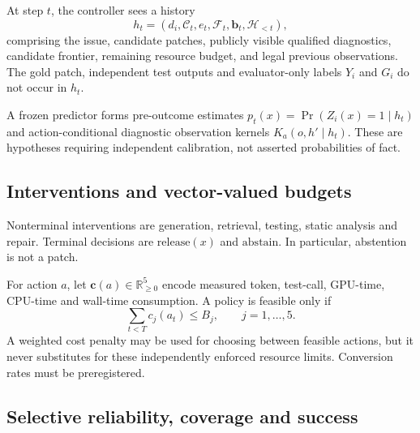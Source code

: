 \documentclass[pdflatex,sn-basic]{sn-jnl}
\begin{document}
At step $t$, the controller sees a history
\begin{equation}
 h_t=(d_i,\mathcal{C}_t,e_t,\mathcal{F}_t,\mathbf b_t,
       \mathcal H_{<t}),
 \label{eq:state}
\end{equation}
comprising the issue, candidate patches, publicly visible qualified
diagnostics, candidate frontier, remaining resource budget, and legal
previous observations. The gold patch, independent test outputs and
evaluator-only labels $Y_i$ and $G_i$ do not occur in $h_t$.

A frozen predictor forms pre-outcome estimates
$p_t(x)=\Pr(Z_i(x)=1\mid h_t)$ and action-conditional diagnostic
observation kernels $K_a(o,h'\mid h_t)$. These are hypotheses requiring
independent calibration, not asserted probabilities of fact.

\subsection{Interventions and vector-valued budgets}

Nonterminal interventions are generation, retrieval, testing, static
analysis and repair. Terminal decisions are $\mathrm{release}(x)$ and
$\mathrm{abstain}$. In particular, abstention is not a patch.

For action $a$, let
$\mathbf c(a)\in\mathbb R^5_{\ge 0}$ encode measured token,
test-call, GPU-time, CPU-time and wall-time consumption.
A policy is feasible only if
\begin{equation}
 \sum_{t<T}c_j(a_t)\le B_j,\qquad j=1,\ldots,5.
 \label{eq:budget}
\end{equation}
A weighted cost penalty may be used for choosing between feasible
actions, but it never substitutes for these independently enforced
resource limits. Conversion rates must be preregistered.

\subsection{Selective reliability, coverage and success}
\end{document}
